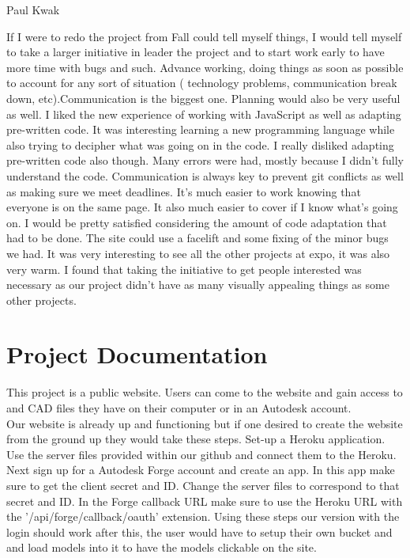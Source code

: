 \documentclass[letterpaper, 10pt, draftclsnofoot, compsoc, onecolumn]{IEEEtran}
\begin{document}
Paul Kwak

If I were to redo the project from Fall could tell myself things, I would tell myself to take a larger initiative in leader the project and to start work early to have more time with bugs and such. Advance working, doing things as soon as possible to account for any sort of situation ( technology problems, communication break down, etc).Communication is the biggest one. Planning would also be very useful as well. I liked the new experience of working with JavaScript as well as adapting pre-written code. It was interesting learning a new programming language while also trying to decipher what was going on in the code. I really disliked adapting pre-written code also though. Many errors were had, mostly because I didn't fully understand the code. Communication is always key to prevent git conflicts as well as making sure we meet deadlines. It's much easier to work knowing that everyone is on the same page. It also much easier to cover if I know what's going on. I would be pretty satisfied considering the amount of code adaptation that had to be done. The site could use a facelift and some fixing of the minor bugs we had. It was very interesting to see all the other projects at expo, it was also very warm. I found that taking the initiative to get people interested was necessary as our project didn't have as many visually appealing things as some other projects.\\

\newpage
\section{Project Documentation}
This project is a public website. Users can come to the website and gain access to and CAD files they have on their computer or in an Autodesk account.\\


Our website is already up and functioning but if one desired to create the website from the ground up they would take these steps. Set-up a Heroku application. Use the server files provided within our github and connect them to the Heroku. Next sign up for a Autodesk Forge account and create an app. In this app make sure to get the client secret and ID. Change the server files to correspond to that secret and ID. In the Forge callback URL make sure to use the Heroku URL with the '/api/forge/callback/oauth' extension. Using these steps our version with the login should work after this, the user would have to setup their own bucket and and load models into it to have the models clickable on the site.\\
\end{document}
